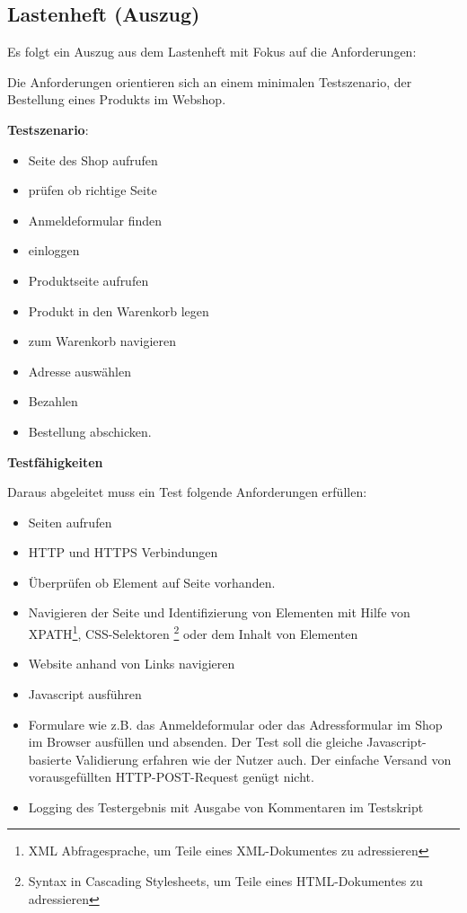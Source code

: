 \subsection{Lastenheft (Auszug)}
\label{app:Lastenheft}

Es folgt ein Auszug aus dem Lastenheft mit Fokus auf die Anforderungen:

Die Anforderungen orientieren sich an einem minimalen Testszenario, der
Bestellung eines Produkts im Webshop.

\textbf{Testszenario}:

\begin{itemize}
\itemsep1pt\parskip0pt
\item
  Seite des Shop aufrufen
\item
  prüfen ob richtige Seite
\item
  Anmeldeformular finden
\item
  einloggen
\item
  Produktseite aufrufen
\item
  Produkt in den Warenkorb legen
\item
  zum Warenkorb navigieren
\item
  Adresse auswählen
\item
  Bezahlen
\item
  Bestellung abschicken.
\end{itemize}

\textbf{Testfähigkeiten}

Daraus abgeleitet muss ein Test folgende Anforderungen erfüllen:

\begin{itemize}
\itemsep1pt\parskip0pt
\item
  Seiten aufrufen
\item
  HTTP und HTTPS Verbindungen
\item
  Überprüfen ob Element auf Seite vorhanden.
\item
  Navigieren der Seite und Identifizierung von Elementen mit Hilfe von
  XPATH\footnote{XML Abfragesprache, um Teile eines XML-Dokumentes zu
    adressieren}, CSS-Selektoren \footnote{Syntax in Cascading
    Stylesheets, um Teile eines HTML-Dokumentes zu adressieren } oder
  dem Inhalt von Elementen
\item
  Website anhand von Links navigieren
\item
  Javascript ausführen
\item
  Formulare wie z.B. das Anmeldeformular oder das Adressformular im Shop
  im Browser ausfüllen und absenden. Der Test soll die gleiche
  Javascript-basierte Validierung erfahren wie der Nutzer auch. Der
  einfache Versand von vorausgefüllten HTTP-POST-Request genügt nicht. 
\item
  Logging des Testergebnis mit Ausgabe von Kommentaren im Testskript
\end{itemize}

